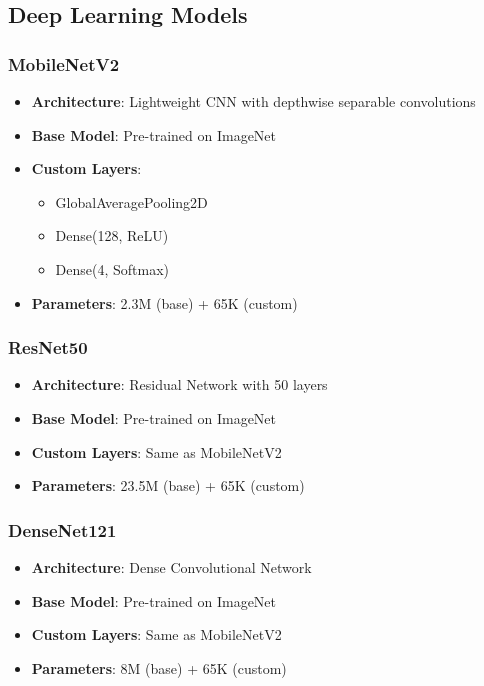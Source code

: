 \documentclass[11pt,a4paper]{article}
\begin{document}
\subsection{Deep Learning Models}

\subsubsection{MobileNetV2}
\begin{itemize}
    \item \textbf{Architecture}: Lightweight CNN with depthwise separable convolutions
    \item \textbf{Base Model}: Pre-trained on ImageNet
    \item \textbf{Custom Layers}: 
    \begin{itemize}
        \item GlobalAveragePooling2D
        \item Dense(128, ReLU)
        \item Dense(4, Softmax)
    \end{itemize}
    \item \textbf{Parameters}: 2.3M (base) + 65K (custom)
\end{itemize}

\subsubsection{ResNet50}
\begin{itemize}
    \item \textbf{Architecture}: Residual Network with 50 layers
    \item \textbf{Base Model}: Pre-trained on ImageNet
    \item \textbf{Custom Layers}: Same as MobileNetV2
    \item \textbf{Parameters}: 23.5M (base) + 65K (custom)
\end{itemize}

\subsubsection{DenseNet121}
\begin{itemize}
    \item \textbf{Architecture}: Dense Convolutional Network
    \item \textbf{Base Model}: Pre-trained on ImageNet
    \item \textbf{Custom Layers}: Same as MobileNetV2
    \item \textbf{Parameters}: 8M (base) + 65K (custom)
\end{itemize}
\end{document}
